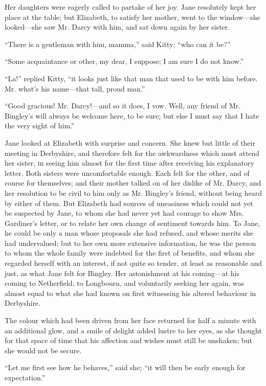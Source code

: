 \documentclass[12pt]{book}
\begin{document}
Her daughters were eagerly called to partake of her joy. Jane resolutely kept her place at the table; but Elizabeth, to satisfy her mother, went to the window---she looked---she saw Mr. Darcy with him, and sat down again by her sister.

``There is a gentleman with him, mamma,'' said Kitty; ``who can it be?''

``Some acquaintance or other, my dear, I suppose; I am sure I do not know.''

``La!'' replied Kitty, ``it looks just like that man that used to be with him before. Mr. what's his name---that tall, proud man.''

``Good gracious! Mr. Darcy!---and so it does, I vow. Well, any friend of Mr. Bingley's will always be welcome here, to be sure; but else I must say that I hate the very sight of him.''

Jane looked at Elizabeth with surprise and concern. She knew but little of their meeting in Derbyshire, and therefore felt for the awkwardness which must attend her sister, in seeing him almost for the first time after receiving his explanatory letter. Both sisters were uncomfortable enough. Each felt for the other, and of course for themselves; and their mother talked on of her dislike of Mr. Darcy, and her resolution to be civil to him only as Mr. Bingley's friend, without being heard by either of them. But Elizabeth had sources of uneasiness which could not yet be suspected by Jane, to whom she had never yet had courage to show Mrs. Gardiner's letter, or to relate her own change of sentiment towards him. To Jane, he could be only a man whose proposals she had refused, and whose merits she had undervalued; but to her own more extensive information, he was the person to whom the whole family were indebted for the first of benefits, and whom she regarded herself with an interest, if not quite so tender, at least as reasonable and just, as what Jane felt for Bingley. Her astonishment at his coming---at his coming to Netherfield, to Longbourn, and voluntarily seeking her again, was almost equal to what she had known on first witnessing his altered behaviour in Derbyshire.

The colour which had been driven from her face returned for half a minute with an additional glow, and a smile of delight added lustre to her eyes, as she thought for that space of time that his affection and wishes must still be unshaken; but she would not be secure.

``Let me first see how he behaves,'' said she; ``it will then be early enough for expectation.''
\end{document}
